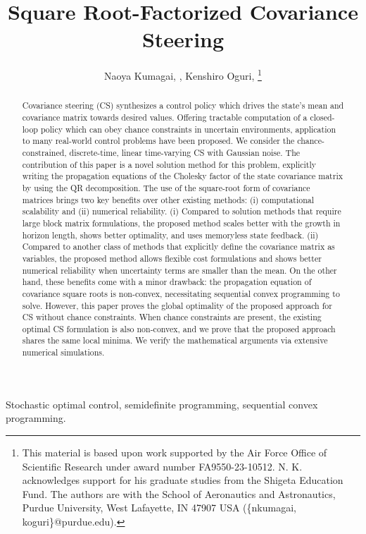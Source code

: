 \documentclass{IEEEtran}
\title{Square Root-Factorized Covariance Steering}
\author{Naoya Kumagai, \IEEEmembership{Graduate Student Member, IEEE}, Kenshiro Oguri, \IEEEmembership{Member, IEEE}
\thanks{This material is based upon work supported by the Air Force Office of Scientific Research under award number FA9550-23-10512. N. K. acknowledges support for his graduate studies from the Shigeta Education Fund. The authors are with the School of Aeronautics and Astronautics, Purdue University, West Lafayette, IN 47907 USA (\{nkumagai, koguri\}@purdue.edu).}}
\begin{document}
\maketitle

\begin{abstract}
Covariance steering (CS) synthesizes a control policy which drives the state's mean and covariance matrix towards desired values. 
Offering tractable computation of a closed-loop policy which can obey chance constraints in uncertain environments, application to many real-world control problems have been proposed.
We consider the chance-constrained, discrete-time, linear time-varying CS with Gaussian noise. The contribution of this paper is a novel solution method for this problem, explicitly writing the propagation equations of the Cholesky factor of the state covariance matrix by using the QR decomposition. 
The use of the square-root form of covariance matrices brings two key benefits over other existing methods: (i) computational scalability and (ii) numerical reliability.  (i) Compared to solution methods that require large block matrix formulations, the proposed method scales better with the growth in horizon length, shows better optimality, and uses memoryless state feedback. 
(ii) Compared to another class of methods that explicitly define the covariance matrix as variables, the proposed method allows flexible cost formulations and shows better numerical reliability when uncertainty terms are smaller than the mean. 
On the other hand, these benefits come with a minor drawback: the propagation equation of covariance square roots is non-convex, necessitating sequential convex programming to solve.  However, this paper proves the global optimality of the proposed approach for CS without chance constraints. When chance constraints are present, the existing optimal CS formulation is also non-convex, and we prove that the proposed approach shares the same local minima. We verify the mathematical arguments via extensive numerical simulations.
\end{abstract}

\begin{IEEEkeywords}
	Stochastic optimal control, semidefinite programming, sequential convex programming.
\end{IEEEkeywords}









\end{document}
